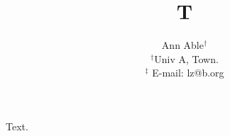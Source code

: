 \documentclass{article}
\title{T}
\author{Ann Able$^{\dagger}$\\
{\small $^{\dagger}$Univ A, Town.}\\
{\small $^{\ddagger}$ E-mail: lz@b.org}\\
}
\date{}
\begin{document}
\maketitle
Text.
\end{document}
